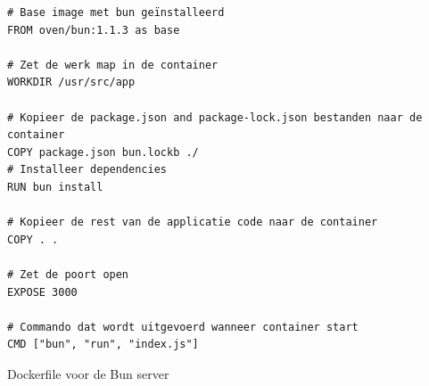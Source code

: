 \begin{listing}[H]
  \centering
  \begin{verbatim}
# Base image met bun geïnstalleerd
FROM oven/bun:1.1.3 as base

# Zet de werk map in de container
WORKDIR /usr/src/app

# Kopieer de package.json and package-lock.json bestanden naar de container
COPY package.json bun.lockb ./
# Installeer dependencies
RUN bun install

# Kopieer de rest van de applicatie code naar de container
COPY . .

# Zet de poort open
EXPOSE 3000

# Commando dat wordt uitgevoerd wanneer container start
CMD ["bun", "run", "index.js"]
      \end{verbatim}
      \caption[Dockerfile Bun server]{\label{code:dockerbun}Dockerfile voor de Bun server}
\end{listing}

